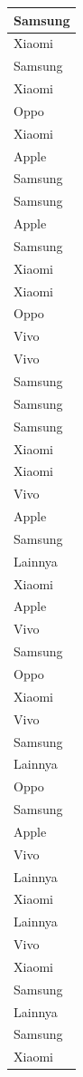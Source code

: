 \documentclass[
  letterpaper,
  DIV=11,
  numbers=noendperiod]{scrartcl}
\begin{document}
\begin{table}
\begin{tabular}[t]{l}
\hline
Samsung\\
\hline
Xiaomi\\
\hline
Samsung\\
\hline
Xiaomi\\
\hline
Oppo\\
\hline
Xiaomi\\
\hline
Apple\\
\hline
Samsung\\
\hline
Samsung\\
\hline
Apple\\
\hline
Samsung\\
\hline
Xiaomi\\
\hline
Xiaomi\\
\hline
Oppo\\
\hline
Vivo\\
\hline
Vivo\\
\hline
Samsung\\
\hline
Samsung\\
\hline
Samsung\\
\hline
Xiaomi\\
\hline
Xiaomi\\
\hline
Vivo\\
\hline
Apple\\
\hline
Samsung\\
\hline
Lainnya\\
\hline
Xiaomi\\
\hline
Apple\\
\hline
Vivo\\
\hline
Samsung\\
\hline
Oppo\\
\hline
Xiaomi\\
\hline
Vivo\\
\hline
Samsung\\
\hline
Lainnya\\
\hline
Oppo\\
\hline
Samsung\\
\hline
Apple\\
\hline
Vivo\\
\hline
Lainnya\\
\hline
Xiaomi\\
\hline
Lainnya\\
\hline
Vivo\\
\hline
Xiaomi\\
\hline
Samsung\\
\hline
Lainnya\\
\hline
Samsung\\
\hline
Xiaomi\\

\end{tabular}
\end{table}
\end{document}
